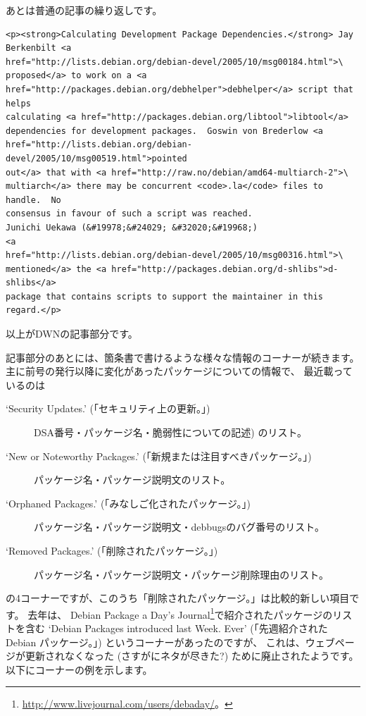 \documentclass[mingoth,a4paper]{jsarticle}
\begin{document}
あとは普通の記事の繰り返しです。

\begin{verbatim}
<p><strong>Calculating Development Package Dependencies.</strong> Jay
Berkenbilt <a
href="http://lists.debian.org/debian-devel/2005/10/msg00184.html">\
proposed</a> to work on a <a
href="http://packages.debian.org/debhelper">debhelper</a> script that helps
calculating <a href="http://packages.debian.org/libtool">libtool</a>
dependencies for development packages.  Goswin von Brederlow <a
href="http://lists.debian.org/debian-devel/2005/10/msg00519.html">pointed
out</a> that with <a href="http://raw.no/debian/amd64-multiarch-2">\
multiarch</a> there may be concurrent <code>.la</code> files to handle.  No
consensus in favour of such a script was reached.  
Junichi Uekawa (&#19978;&#24029; &#32020;&#19968;)
<a
href="http://lists.debian.org/debian-devel/2005/10/msg00316.html">\
mentioned</a> the <a href="http://packages.debian.org/d-shlibs">d-shlibs</a>
package that contains scripts to support the maintainer in this regard.</p>
\end{verbatim}

以上がDWNの記事部分です。

記事部分のあとには、箇条書で書けるような様々な情報のコーナーが続きます。
主に前号の発行以降に変化があったパッケージについての情報で、
最近載っているのは
\begin{description}
 \item[`Security Updates.' (「セキュリティ上の更新。」)]
   DSA番号・パッケージ名・脆弱性についての記述) のリスト。
 \item[`New or Noteworthy Packages.' (「新規または注目すべきパッケージ。」)]
   パッケージ名・パッケージ説明文のリスト。
 \item[`Orphaned Packages.' (「みなしご化されたパッケージ。」)]
   パッケージ名・パッケージ説明文・debbugsのバグ番号のリスト。
 \item[`Removed Packages.' (「削除されたパッケージ。」)]
   パッケージ名・パッケージ説明文・パッケージ削除理由のリスト。
\end{description}
の4コーナーですが、このうち「削除されたパッケージ。」は比較的新しい項目です。
去年は、
Debian Package a Day's Journal\footnote{\url{http://www.livejournal.com/users/debaday/}。}で紹介されたパッケージのリストを含む
`Debian Packages introduced last Week. Ever' (「先週紹介された Debian パッケージ。」) というコーナーがあったのですが、
これは、ウェブページが更新されなくなった (さすがにネタが尽きた?) ために廃止されたようです。
以下にコーナーの例を示します。
\end{document}
